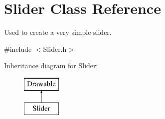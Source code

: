 \hypertarget{class_slider}{}\section{Slider Class Reference}
\label{class_slider}


Used to create a very simple slider.  




{\ttfamily \#include $<$Slider.\+h$>$}

Inheritance diagram for Slider\+:\begin{figure}[H]
\begin{center}
\leavevmode
\includegraphics[height=2.000000cm]{class_slider}
\end{center}
\end{figure}
